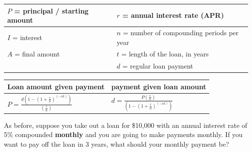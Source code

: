 \documentclass[12pt]{article}
\renewcommand{\emph}[1]{\textsf{\textbf{#1}}}
\begin{document}
\begin{enumerate}
\begin{enumerate}
	\begin{tabular}{| l | l |}
\hline
$P$ = principal / starting amount & $r$ = annual interest rate (APR) \\ \hline
$I$ = interest & $n$ = number of compounding periods per year\\ \hline
$A$ = final amount & $t$ = length of the loan, in years\\ \hline
& $d$ = regular loan payment \\ \hline
\end{tabular}


\begin{center}
\begin{tabularx}{.8\linewidth}{|X | X|} 
\hline
Loan amount given payment & payment given loan amount\\ \hline
$\displaystyle P = \frac{d\left(1 - \left(1+\frac{r}{n}\right)^{(-nt)}\right)}{\left(\frac{r}{n}\right)}$ & $\displaystyle d = \frac{P\left(\frac{r}{n}\right)}{\left(1 - \left(1+\frac{r}{n}\right)^{(-nt)}\right)}$\\
\hline
\end{tabularx}
\end{center}


As before, suppose you take out a loan for \$10,000 with an annual interest rate of 5\% compounded \emph{monthly} and you are going to make payments monthly. If you want to pay off the loan in 3 years, what should your monthly payment be?

\vfill




	
	
	\end{enumerate}


\end{enumerate}
\end{document}
